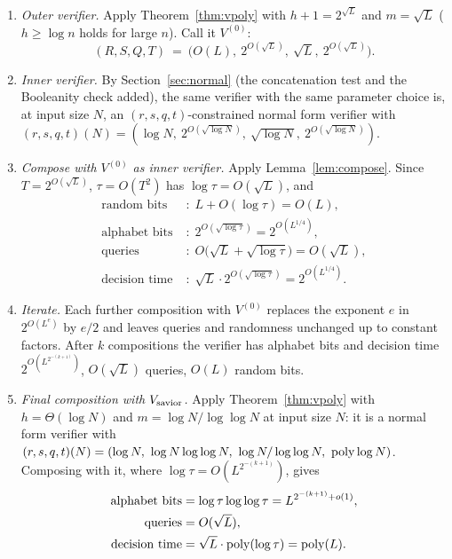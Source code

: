 \begin{enumerate}[label=\textbf{Step \arabic*.},leftmargin=*]
  \item \emph{Outer verifier.}  Apply Theorem~\ref{thm:vpoly} with $h+1=2^{\sqrt L}$ and $m=\sqrt L$ ($h\ge\log n$ holds for large $n$).  Call it $V^{(0)}$:
        \[
          (R,S,Q,T)\ =\ \bigl(O(L),\ 2^{O(\sqrt L)},\ \sqrt L,\ 2^{O(\sqrt L)}\bigr).
        \]
  \item \emph{Inner verifier.}  By Section~\ref{sec:normal} (the concatenation test and the Booleanity check added), the same verifier with the same parameter choice is, at input size $N$, an
        $(r,s,q,t)$-constrained normal form verifier with $(r,s,q,t)(N)=(\log N,\ 2^{O(\sqrt{\log N})},\ \sqrt{\log N},\ 2^{O(\sqrt{\log N})})$.
  \item \emph{Compose with $V^{(0)}$ as inner verifier.}  Apply Lemma~\ref{lem:compose}.  Since $T=2^{O(\sqrt L)}$, $\tau=O(T^2)$ has $\log\tau=O(\sqrt L)$, and
        \[
          \begin{aligned}
          \text{random bits}&\;:\; L+O(\log\tau)=O(L),\\
          \text{alphabet bits}&\;:\; 2^{O(\sqrt{\log\tau})}=2^{O(L^{1/4})},\\
          \text{queries}&\;:\; O\bigl(\sqrt L+\sqrt{\log\tau}\bigr)=O(\sqrt L),\\
          \text{decision time}&\;:\; \sqrt L\cdot2^{O(\sqrt{\log\tau})}=2^{O(L^{1/4})}.
          \end{aligned}
        \]
  \item \emph{Iterate.}  Each further composition with $V^{(0)}$ replaces the exponent $e$ in $2^{O(L^{e})}$ by $e/2$ and leaves queries and randomness unchanged up to constant factors.  After $k$ compositions the verifier has
        alphabet bits and decision time $2^{O(L^{2^{-(k+1)}})}$, $O(\sqrt L)$ queries, $O(L)$ random bits.
  \item \emph{Final composition with $V_{\rm savior}$.}  Apply Theorem~\ref{thm:vpoly} with $h=\Theta(\log N)$ and $m=\log N/\log\log N$ at input size $N$: it is a normal form verifier with
        $(r,s,q,t)(N)=(\log N,\ \log N\log\log N,\ \log N/\log\log N,\ \operatorname{poly}\log N)$.  Composing with it, where $\log\tau=O(L^{2^{-(k+1)}})$, gives
        \begin{align*}
          \text{alphabet bits}&=\log\tau\log\log\tau=L^{2^{-(k+1)}+o(1)},\\
          \text{queries}&=O(\sqrt L),\\
          \text{decision time}&=\sqrt L\cdot\operatorname{poly}(\log\tau)=\operatorname{poly}(L).
        \end{align*}
\end{enumerate}

